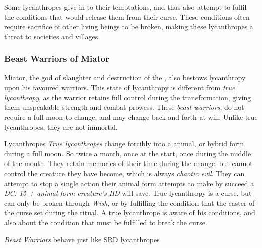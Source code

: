 Some lycanthropes give in to their temptations, and thus also attempt to
fulfil the conditions that would release them from their curse. These
conditions often require sacrifice of other living beings to be broken, making
these lycanthropes a threat to societies and villages.

\subsubsection{Beast Warriors of Miator}
\label{sec:Beast Warriors}

Miator, the god of slaughter and destruction of the ,
also bestows lycanthropy upon his favoured warriors. This state of lycanthropy
is different from \emph{true lycanthropy}, as the warrior retains full control
during the transformation, giving them unspeakable strength and combat prowess.
These \emph{beast warriors}, do not require a full moon to change, and may
change back and forth at will. Unlike true lycanthropes, they are not immortal.

\begin{35e}{Lycanthropes}
  \emph{True lycanthropes} change forcibly into a animal, or hybrid form
  during a full moon. So twice a month, once at the start, once during the
  middle of the month. They retain memories of their time during the
  change, but cannot control the creature they have become, which is always
  \emph{chaotic evil}. They can attempt to stop a single action their animal
  form attempts to make by succeed a \emph{DC: 15 + animal form creature's HD}
  will save. True lycanthropy is a curse, but can only be broken through
  \emph{Wish}, or by fulfilling the condition that the caster of the curse set
  during the ritual. A true lycanthrope is aware of his conditions, and also
  about the condition that must be fulfilled to break the curse.

  \emph{Beast Warriors} behave just like SRD lycanthropes
\end{35e}
